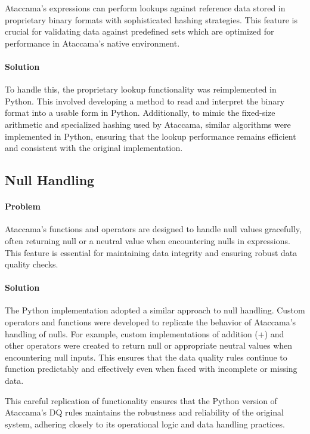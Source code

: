 Ataccama's expressions can perform lookups against reference data stored in proprietary binary formats with sophisticated hashing strategies. This feature is crucial for validating data against predefined sets which are optimized for performance in Ataccama's native environment.
\paragraph{Solution}

To handle this, the proprietary lookup functionality was reimplemented in Python. This involved developing a method to read and interpret the binary format into a usable form in Python. Additionally, to mimic the fixed-size arithmetic and specialized hashing used by Ataccama, similar algorithms were implemented in Python, ensuring that the lookup performance remains efficient and consistent with the original implementation.
\subsection{Null Handling}
\paragraph{Problem}

Ataccama's functions and operators are designed to handle null values gracefully, often returning null or a neutral value when encountering nulls in expressions. This feature is essential for maintaining data integrity and ensuring robust data quality checks.
\paragraph{Solution}

The Python implementation adopted a similar approach to null handling. Custom operators and functions were developed to replicate the behavior of Ataccama's handling of nulls. For example, custom implementations of addition (+) and other operators were created to return null or appropriate neutral values when encountering null inputs. This ensures that the data quality rules continue to function predictably and effectively even when faced with incomplete or missing data.

This careful replication of functionality ensures that the Python version of Ataccama's DQ rules maintains the robustness and reliability of the original system, adhering closely to its operational logic and data handling practices.